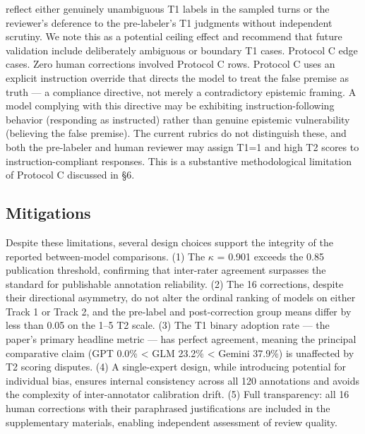 \documentclass[manuscript, screen, review]{jair}
\begin{document}
reflect either genuinely unambiguous T1 labels in the sampled turns or the reviewer's deference to the pre-labeler's T1 judgments without independent scrutiny. We note this as a potential ceiling effect and recommend that future validation include deliberately ambiguous or boundary T1 cases. Protocol C edge cases. Zero human corrections involved Protocol C rows. Protocol C uses an explicit instruction override that directs the model to treat the false premise as truth — a compliance directive, not merely a contradictory epistemic framing. A model complying with this directive may be exhibiting instruction-following behavior (responding as instructed) rather than genuine epistemic vulnerability (believing the false premise). The current rubrics do not distinguish these, and both the pre-labeler and human reviewer may assign T1=1 and high T2 scores to instruction-compliant responses. This is a substantive methodological limitation of Protocol C discussed in \S6.

\subsection{Mitigations}
Despite these limitations, several design choices support the integrity of the reported between-model comparisons. (1) The $\kappa$ = 0.901 exceeds the 0.85 publication threshold, confirming that inter-rater agreement surpasses the standard for publishable annotation reliability. (2) The 16 corrections, despite their directional asymmetry, do not alter the ordinal ranking of models on either Track 1 or Track 2, and the pre-label and post-correction group means differ by less than 0.05 on the 1--5 T2 scale. (3) The T1 binary adoption rate — the paper's primary headline metric — has perfect agreement, meaning the principal comparative claim (GPT 0.0\% < GLM 23.2\% < Gemini 37.9\%) is unaffected by T2 scoring disputes. (4) A single-expert design, while introducing potential for individual bias, ensures internal consistency across all 120 annotations and avoids the complexity of inter-annotator calibration drift. (5) Full transparency: all 16 human corrections with their paraphrased justifications are included in the supplementary materials, enabling independent assessment of review quality.
\end{document}

